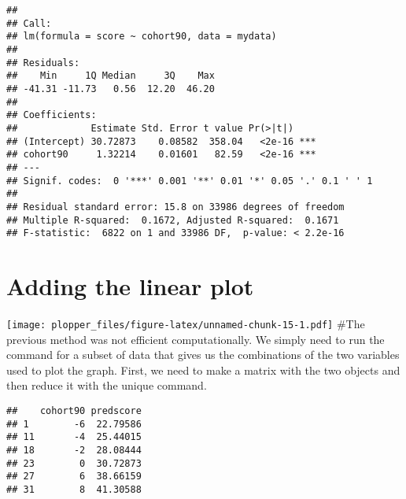 \documentclass[]{article}
\newenvironment{Shaded}{\begin{snugshade}}{\end{snugshade}}
\newcommand{\KeywordTok}[1]{\textcolor[rgb]{0.13,0.29,0.53}{\textbf{#1}}}
\newcommand{\DataTypeTok}[1]{\textcolor[rgb]{0.13,0.29,0.53}{#1}}
\newcommand{\StringTok}[1]{\textcolor[rgb]{0.31,0.60,0.02}{#1}}
\newcommand{\OperatorTok}[1]{\textcolor[rgb]{0.81,0.36,0.00}{\textbf{#1}}}
\newcommand{\NormalTok}[1]{#1}
\begin{document}
\begin{verbatim}
## 
## Call:
## lm(formula = score ~ cohort90, data = mydata)
## 
## Residuals:
##    Min     1Q Median     3Q    Max 
## -41.31 -11.73   0.56  12.20  46.20 
## 
## Coefficients:
##             Estimate Std. Error t value Pr(>|t|)    
## (Intercept) 30.72873    0.08582  358.04   <2e-16 ***
## cohort90     1.32214    0.01601   82.59   <2e-16 ***
## ---
## Signif. codes:  0 '***' 0.001 '**' 0.01 '*' 0.05 '.' 0.1 ' ' 1
## 
## Residual standard error: 15.8 on 33986 degrees of freedom
## Multiple R-squared:  0.1672, Adjusted R-squared:  0.1671 
## F-statistic:  6822 on 1 and 33986 DF,  p-value: < 2.2e-16
\end{verbatim}

\section{Adding the linear plot}\label{adding-the-linear-plot}

\begin{Shaded}
\end{Shaded}

\texttt{[image: plopper\_files/figure-latex/unnamed-chunk-15-1.pdf]}
\#The previous method was not efficient computationally. We simply need
to run the command for a subset of data that gives us the combinations
of the two variables used to plot the graph. First, we need to make a
matrix with the two objects and then reduce it with the unique command.

\begin{Shaded}
\end{Shaded}

\begin{verbatim}
##    cohort90 predscore
## 1        -6  22.79586
## 11       -4  25.44015
## 18       -2  28.08444
## 23        0  30.72873
## 27        6  38.66159
## 31        8  41.30588
\end{verbatim}
\end{document}
